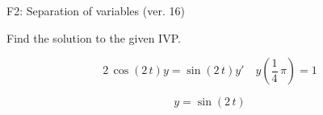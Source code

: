 \begin{exercise}
  \begin{exerciseTitle}F2: Separation of variables (ver. 16)\end{exerciseTitle}
  \begin{exerciseStatement}
    
Find the solution to the given IVP.

    
\[2 \, \cos\left(2 \, t\right) y= \sin\left(2 \, t\right) y'\hspace{1em} y\left( \frac{1}{4} \, \pi \right)= 1\]

  \end{exerciseStatement}
  \begin{exerciseAnswer}
    
\[y= \sin\left(2 \, t\right)\]

  \end{exerciseAnswer}
\end{exercise}
